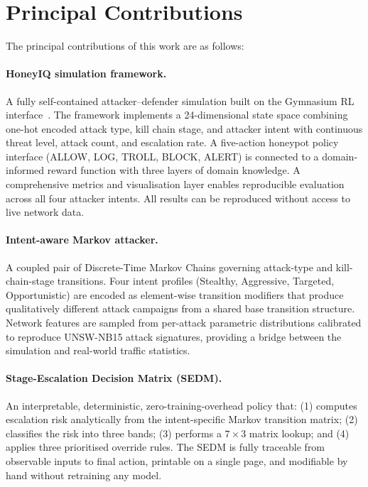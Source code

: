 \section{Principal Contributions}

The principal contributions of this work are as follows:

\paragraph{HoneyIQ simulation framework.}
A fully self-contained attacker--defender simulation built on the Gymnasium RL
interface~\citep{towers2024gymnasium}.
The framework implements a 24-dimensional state space combining one-hot encoded
attack type, kill chain stage, and attacker intent with continuous threat level,
attack count, and escalation rate.
A five-action honeypot policy interface (ALLOW, LOG, TROLL, BLOCK, ALERT) is
connected to a domain-informed reward function with three layers of domain
knowledge.
A comprehensive metrics and visualisation layer enables reproducible evaluation
across all four attacker intents.
All results can be reproduced without access to live network data.

\paragraph{Intent-aware Markov attacker.}
A coupled pair of Discrete-Time Markov Chains governing attack-type and
kill-chain-stage transitions.
Four intent profiles (Stealthy, Aggressive, Targeted, Opportunistic) are
encoded as element-wise transition modifiers that produce qualitatively
different attack campaigns from a shared base transition structure.
Network features are sampled from per-attack parametric distributions
calibrated to reproduce UNSW-NB15 attack signatures, providing a bridge
between the simulation and real-world traffic statistics.

\paragraph{Stage-Escalation Decision Matrix (SEDM).}
An interpretable, deterministic, zero-training-overhead policy that:
(1) computes escalation risk analytically from the intent-specific Markov
transition matrix; (2) classifies the risk into three bands;
(3) performs a $7 \times 3$ matrix lookup; and
(4) applies three prioritised override rules.
The SEDM is fully traceable from observable inputs to final action,
printable on a single page, and modifiable by hand without retraining
any model.

